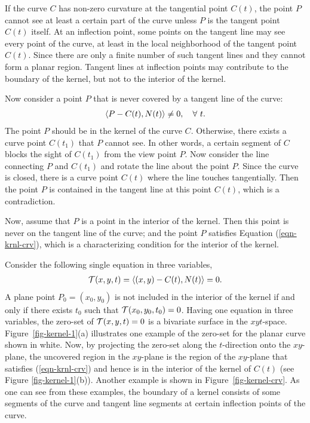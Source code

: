 \documentclass[doublespacing]{elsart}
\begin{document}
If the curve $C$ has non-zero curvature at the tangential point $C(t)$,
the point $P$ cannot see at least a certain part of the curve
unless $P$ is the tangent point $C(t)$ itself.
At an inflection point, some points on the tangent line may see
every point of the curve, at least in the local neighborhood of
the tangent point $C(t)$.  Since there are only a finite number of
such tangent lines and they cannot form a planar region.
Tangent lines at inflection points may contribute to
the boundary of the kernel, but not to the interior of the kernel.

Now consider a point $P$ that is never covered by a tangent line
of the curve:
\begin{eqnarray}
\inner{P - C(t)}{N(t)} \neq 0,\quad \forall\ t.
\label{def-krnl-crv}
\end{eqnarray}
The point $P$ should be in the kernel of the curve $C$.
Otherwise, there exists a curve point $C(t_1)$ that $P$ cannot see.
In other words, a certain segment of $C$ blocks the sight of $C(t_1)$
from the view point $P$.  Now consider the line connecting $P$ and
$C(t_1)$ and rotate the line about the point $P$.  Since the curve
is closed, there is a curve point $C(t)$ where the line touches
tangentially.  Then the point $P$ is contained in the tangent line
at this point $C(t)$, which is a contradiction.

Now, assume that $P$ is a point in the interior of the kernel.
Then this point is never on the tangent line of the curve; and
the point $P$ satisfies Equation (\ref{eqn-krnl-crv}),
which is a characterizing condition for the interior of the kernel.
 
Consider the following single equation in three variables, 
\begin{eqnarray}
{\cal T}(x, y, t) = \inner{(x, y) - C(t)}{N(t)} = 0. \label{eqn-kernel-crv}
\end{eqnarray}
A plane point $P_0 = (x_0, y_0)$ is not included in the interior of
the kernel if and only if there exists
$t_0$ such that ${\cal T}(x_0, y_0, t_0) = 0$. Having one equation in 
three variables, the zero-set of ${\cal T}(x, y, t) = 0$ is a bivariate 
surface in the $xyt$-space. 
Figure~\ref{fig-kernel-1}(a) illustrates one example of the zero-set for the 
planar curve shown in white.  Now, by projecting the zero-set along
the $t$-direction onto the $xy$-plane, the uncovered region in the $xy$-plane 
is the region of the $xy$-plane that satisfies (\ref{eqn-krnl-crv})
and hence is in the interior of the kernel of $C(t)$
(see Figure \ref{fig-kernel-1}(b)).
Another example is shown in Figure~\ref{fig-kernel-crv}.
As one can see from these examples, the boundary of a kernel consists
of some segments of the curve and tangent line segments
at certain inflection points of the curve.
\end{document}
